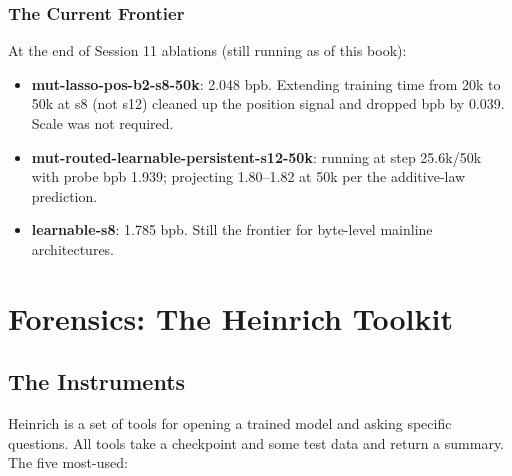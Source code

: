 \documentclass[11pt,openany]{book}
\theoremstyle{definition}
\theoremstyle{plain}
\begin{document}
\section{The Current Frontier}

At the end of Session 11 ablations (still running as of this book):
\begin{itemize}
  \item \textbf{mut-lasso-pos-b2-s8-50k}: 2.048 bpb. Extending training
    time from 20k to 50k at s8 (not s12) cleaned up the position signal
    and dropped bpb by 0.039. Scale was not required.
  \item \textbf{mut-routed-learnable-persistent-s12-50k}: running at
    step 25.6k/50k with probe bpb 1.939; projecting 1.80--1.82 at
    50k per the additive-law prediction.
  \item \textbf{learnable-s8}: 1.785 bpb. Still the frontier for byte-level
    mainline architectures.
\end{itemize}

\part{Forensics: The Heinrich Toolkit}

\chapter{The Instruments}
\label{ch:forensics}

Heinrich is a set of tools for opening a trained model and asking
specific questions. All tools take a checkpoint and some test data and
return a summary. The five most-used:
\end{document}
